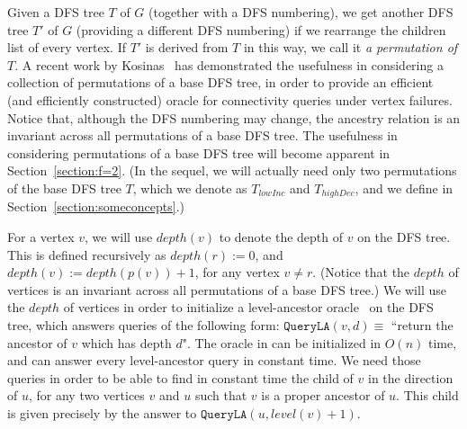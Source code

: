 \documentclass[11pt,a4paper]{article}
\begin{document}
Given a DFS tree $T$ of $G$ (together with a DFS numbering), we get another DFS tree $T'$ of $G$ (providing a different DFS numbering) if we rearrange the children list of every vertex. If $T'$ is derived from $T$ in this way, we call it \emph{a permutation of $T$}. A recent work by Kosinas~\cite{DBLP:conf/esa/Kosinas23} has demonstrated the usefulness in considering a collection of permutations of a base DFS tree, in order to provide an efficient (and efficiently constructed) oracle for connectivity queries under vertex failures. Notice that, although the DFS numbering may change, the ancestry relation is an invariant across all permutations of a base DFS tree. The usefulness in considering permutations of a base DFS tree will become apparent in Section~\ref{section:f=2}. (In the sequel, we will actually need only two permutations of the base DFS tree $T$, which we denote as $T_\mathit{lowInc}$ and $T_\mathit{highDec}$, and we define in Section~\ref{section:someconcepts}.)

For a vertex $v$, we will use $\mathit{depth}(v)$ to denote the depth of $v$ on the DFS tree. This is defined recursively as $\mathit{depth}(r):=0$, and $\mathit{depth}(v):=\mathit{depth}(p(v))+1$, for any vertex $v\neq r$. (Notice that the $\mathit{depth}$ of vertices is an invariant across all permutations of a base DFS tree.) We will use the $\mathit{depth}$ of vertices in order to initialize a level-ancestor oracle~\cite{DBLP:journals/tcs/BenderF04} on the DFS tree, which answers queries of the following form: $\mathtt{QueryLA}(v,d)\equiv$ ``return the ancestor of $v$ which has depth $d$". The oracle in \cite{DBLP:journals/tcs/BenderF04} can be initialized in $O(n)$ time, and can answer every level-ancestor query in constant time. We need those queries in order to be able to find in constant time the child of $v$ in the direction of $u$, for any two vertices $v$ and $u$ such that $v$ is a proper ancestor of $u$. This child is given precisely by the answer to $\mathtt{QueryLA}(u,\mathit{level}(v)+1)$. 
\end{document}
